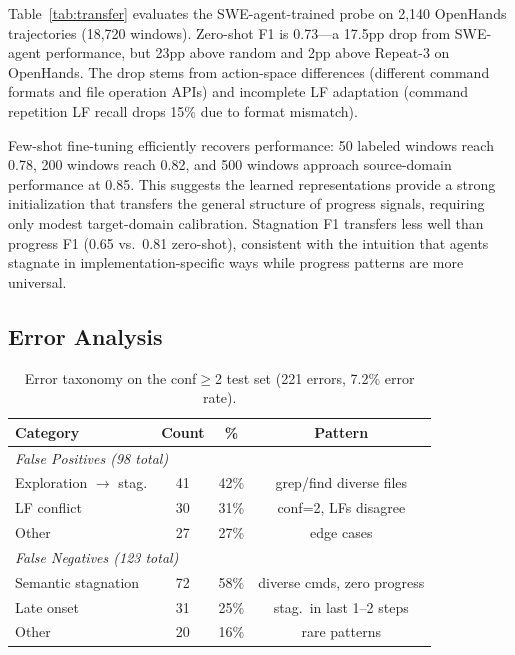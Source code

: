\documentclass[11pt]{article}
\begin{document}
Table~\ref{tab:transfer} evaluates the SWE-agent-trained probe on 2,140 OpenHands trajectories (18,720 windows). Zero-shot F1 is 0.73---a 17.5pp drop from SWE-agent performance, but 23pp above random and 2pp above Repeat-3 on OpenHands. The drop stems from action-space differences (different command formats and file operation APIs) and incomplete LF adaptation (command repetition LF recall drops 15\% due to format mismatch).

Few-shot fine-tuning efficiently recovers performance: 50 labeled windows reach 0.78, 200 windows reach 0.82, and 500 windows approach source-domain performance at 0.85. This suggests the learned representations provide a strong initialization that transfers the general structure of progress signals, requiring only modest target-domain calibration. Stagnation F1 transfers less well than progress F1 (0.65 vs.\ 0.81 zero-shot), consistent with the intuition that agents stagnate in implementation-specific ways while progress patterns are more universal.

\subsection{Error Analysis}
\label{sec:errors}

\begin{table}[t]
\centering
\small
\begin{tabular}{lccc}
\toprule
\textbf{Category} & \textbf{Count} & \textbf{\%} & \textbf{Pattern} \\
\midrule
\multicolumn{4}{l}{\emph{False Positives (98 total)}} \\
\quad Exploration $\to$ stag. & 41 & 42\% & grep/find diverse files \\
\quad LF conflict & 30 & 31\% & conf=2, LFs disagree \\
\quad Other & 27 & 27\% & edge cases \\
\midrule
\multicolumn{4}{l}{\emph{False Negatives (123 total)}} \\
\quad Semantic stagnation & 72 & 58\% & diverse cmds, zero progress \\
\quad Late onset & 31 & 25\% & stag.\ in last 1--2 steps \\
\quad Other & 20 & 16\% & rare patterns \\
\bottomrule
\end{tabular}
\caption{Error taxonomy on the conf$\geq$2 test set (221 errors, 7.2\% error rate).}
\label{tab:errors}
\end{table}
\end{document}
